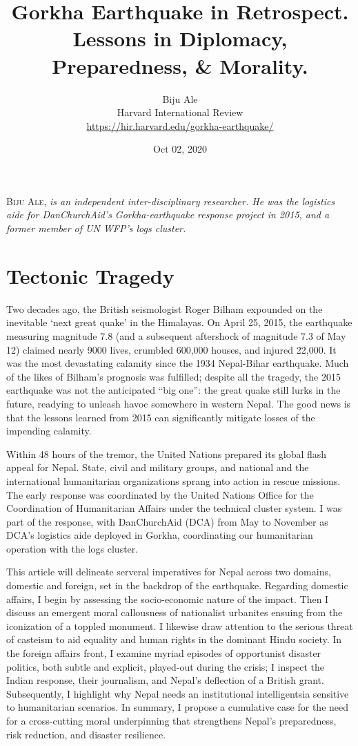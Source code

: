 \documentclass[a4paper,,twocolumn]{article}
\title{Gorkha Earthquake in Retrospect.  \\ \large{Lessons in Diplomacy, Preparedness, \& Morality.}\vspace{-1ex}}
\author{Biju Ale \\Harvard International Review\\ \small{\url{https://hir.harvard.edu/gorkha-earthquake/}}}
\date{Oct 02, 2020\vspace{-3ex}}
\begin{document}
	\maketitle
	\setlength{\parskip}{.5em}
	
	\lettrine{B}{iju Ale}, \textit{is an independent inter-disciplinary researcher. He was the logistics aide for DanChurchAid’s Gorkha-earthquake response project in 2015, and a former member of UN WFP’s logs cluster.}
	
	\section*{Tectonic Tragedy}
	
	Two decades ago, the British seismologist Roger Bilham expounded on the inevitable ‘next great quake’\autocite{roger_bilham_next_2015} in the Himalayas. On April 25, 2015, the earthquake\autocite{roger_bilham_subterranean_2015} measuring magnitude 7.8 (and a subsequent aftershock of magnitude 7.3 of May 12) claimed nearly 9000 lives, crumbled 600,000 houses, and injured 22,000. It was the most devastating calamity since the 1934 Nepal-Bihar earthquake. Much of the likes of Bilham’s prognosis was fulfilled; despite all the tragedy, the 2015 earthquake was not the anticipated ``big one'':  the great quake still lurks in the future, readying to unleash havoc somewhere in western Nepal. The good news is that the lessons learned from 2015 can significantly mitigate losses of the impending calamity.
	
	Within 48 hours of the tremor, the United Nations prepared its global flash appeal for Nepal. State, civil and military groups, and national and the international humanitarian organizations sprang into action in rescue missions. The early response was coordinated by the United Nations Office for the Coordination of Humanitarian Affairs under the technical cluster system. I was part\autocite{logistics_cluster_logistics_2015} of the response, with DanChurchAid (DCA)\autocite{nodhjaelp_about_2018} from May to November as DCA’s logistics aide deployed in Gorkha, coordinating our humanitarian operation with\autocite{logistics_cluster_meeting_2015} the logs cluster.
	
	This article will delineate serveral imperatives for Nepal across two domains, domestic and foreign, set in the backdrop of the earthquake. Regarding domestic affairs, I begin by assessing the socio-economic nature of the impact. Then I discuss an emergent moral callousness of nationalist urbanites ensuing from the iconization of a toppled monument. I likewise draw attention to the serious threat of casteism to aid equality and human rights in the dominant Hindu society. In the foreign affairs front, I examine myriad episodes of opportunist disaster politics, both subtle and explicit, played-out during the crisis; I  inspect the Indian response,  their journalism, and Nepal’s deflection of a British grant. Subsequently, I highlight why Nepal needs an institutional intelligentsia sensitive to humanitarian scenarios. In summary, I propose a cumulative case for the need for a cross-cutting moral underpinning that strengthens Nepal’s preparedness, risk reduction, and disaster resilience.
	
\end{document}
